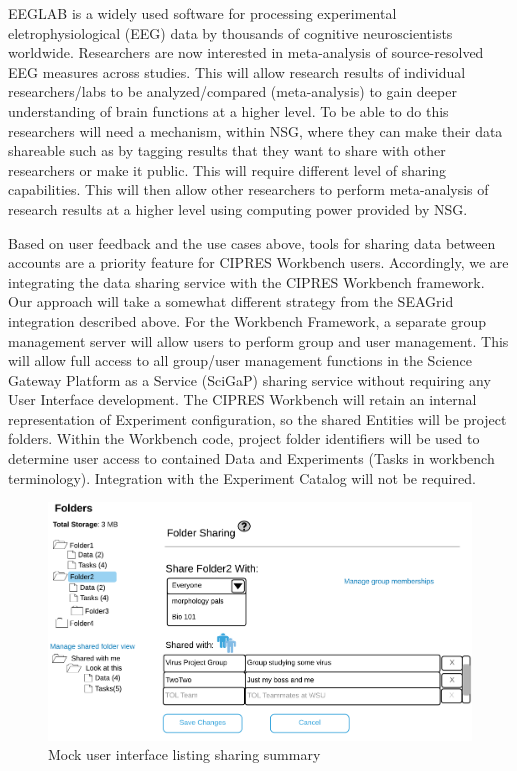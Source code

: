 \documentclass[sigconf]{acmart}
\begin{document}
EEGLAB \cite{delorme2004eeglab} is a widely used software for processing experimental eletrophysiological (EEG) data by thousands of cognitive neuroscientists worldwide. Researchers are now interested in meta-analysis of source-resolved EEG measures across studies. This will allow research results of individual researchers/labs to be analyzed/compared (meta-analysis) to gain deeper understanding of brain functions at a higher level. To be able to do this researchers will need a mechanism, within NSG, where they can make their data shareable such as by tagging results that they want to share with other researchers or make it public. This will require different level of sharing capabilities. This will then allow other researchers to perform meta-analysis of research results at a higher level using computing power provided by NSG.

Based on user feedback and the use cases above, tools for sharing data between accounts  are a priority feature for CIPRES Workbench users. Accordingly, we are integrating the data sharing service with the CIPRES Workbench framework. Our approach will take a somewhat different strategy from the SEAGrid integration described above. For the Workbench Framework, a separate group management server will allow users to perform group and user management. This will allow full access to all group/user management functions in the Science Gateway Platform as a Service (SciGaP) sharing service without requiring any User Interface development. The CIPRES Workbench will retain an internal representation of Experiment configuration, so the shared Entities will be project folders.  Within the Workbench code, project folder identifiers will be used to determine user access to contained Data and Experiments (Tasks in workbench terminology). Integration with the Experiment Catalog will not be required.

\begin{figure}
\includegraphics[width=\columnwidth]{figures/cipres-mock-1.pdf}
\caption{Mock user interface listing sharing summary}
\end{figure}
\end{document}
